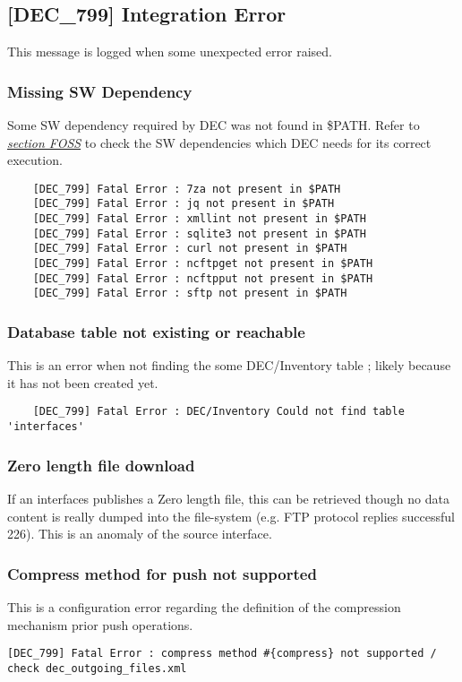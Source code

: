 \documentclass[dec_sum_main.tex]{subfiles}
\begin{document}
\label{DEC799}
\subsection{[DEC\_799] Integration Error}
This message is logged when some unexpected error raised. 

\subsubsection{Missing SW Dependency}
Some SW dependency required by DEC was not found in \$PATH. Refer to \hyperref[FOSS]{\textit{section FOSS}} to check the SW dependencies which DEC needs for its correct execution.
\begin{verbatim}
	[DEC_799] Fatal Error : 7za not present in $PATH
	[DEC_799] Fatal Error : jq not present in $PATH
	[DEC_799] Fatal Error : xmllint not present in $PATH
	[DEC_799] Fatal Error : sqlite3 not present in $PATH
	[DEC_799] Fatal Error : curl not present in $PATH
	[DEC_799] Fatal Error : ncftpget not present in $PATH
	[DEC_799] Fatal Error : ncftpput not present in $PATH
	[DEC_799] Fatal Error : sftp not present in $PATH
\end{verbatim}

\subsubsection{Database table not existing or reachable}
This is an error when not finding the some DEC/Inventory table ; likely because it has not been created yet.
\begin{verbatim}
	[DEC_799] Fatal Error : DEC/Inventory Could not find table 'interfaces'
\end{verbatim}

\subsubsection{Zero length file download}
If an interfaces publishes a Zero length file, this can be retrieved though no data content is really dumped into the file-system (e.g. FTP protocol replies successful 226). This is an anomaly of the source interface.

\subsubsection{Compress method for push not supported}
This is a configuration error regarding the definition of the compression mechanism prior push operations.
\begin{verbatim}
[DEC_799] Fatal Error : compress method #{compress} not supported / check dec_outgoing_files.xml
\end{verbatim}
\end{document}

